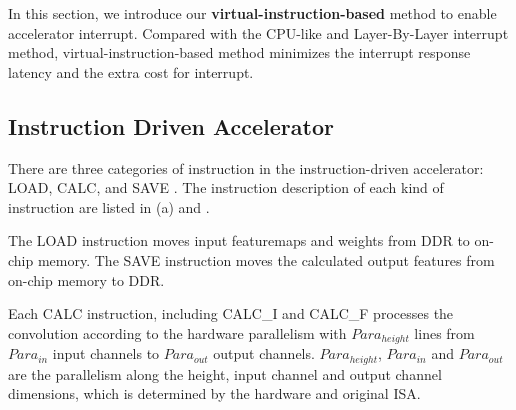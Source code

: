 \label{sec:cnninterrupt}





In this section, we introduce our \textbf{virtual-instruction-based} method to enable accelerator interrupt. Compared with the CPU-like and Layer-By-Layer interrupt method, virtual-instruction-based method minimizes the interrupt response latency and the extra cost for interrupt.

\subsection{ Instruction Driven Accelerator }

There are three categories of instruction in the instruction-driven accelerator: LOAD, CALC, and SAVE \cite{guo2017angel,qiu2016going,yu2018instruction}. The instruction description of each kind of instruction are listed in (a) and .

The LOAD instruction moves input featuremaps and weights from DDR to on-chip memory. The SAVE instruction moves the calculated output features from on-chip memory to DDR. 

Each CALC  instruction,  including CALC\_I and CALC\_F processes the convolution according to the hardware parallelism with $Para_{height}$ lines from $ Para_{in} $ input channels to $ Para_{out}$ output channels. $Para_{height}$, $ Para_{in} $ and $ Para_{out} $ are the parallelism along the height, input channel and output channel dimensions, which is determined by the hardware and original ISA.

